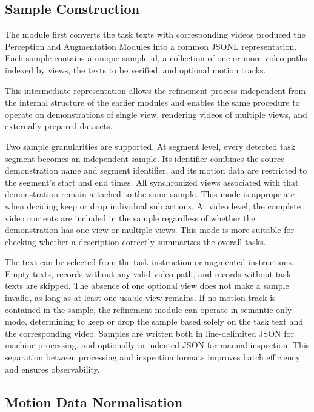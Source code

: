 \documentclass[11pt,oneside]{report}
\begin{document}
\subsection{Sample Construction}

The module first converts the task texts with corresponding videos produced the Perception and Augmentation Modules into a common JSONL representation. Each sample contains a unique sample id, a collection of one or more video paths indexed by views, the texts to be verified, and optional motion tracks.

This intermediate representation allows the refinement process independent from the internal structure of the earlier modules and enables the same procedure to operate on demonstrations of single view, rendering videos of multiple views, and externally prepared datasets.

Two sample granularities are supported. At segment level, every detected task segment becomes an independent sample. Its identifier combines the source demonstration name and segment identifier, and its motion data are restricted to the segment's start and end times. All synchronized views associated with that demonstration remain attached to the same sample. This mode is appropriate when deciding keep or drop individual sub actions. At video level, the complete video contents are included in the sample regardless of whether the demonstration has one view or multiple views. This mode is more suitable for checking whether a description correctly summarizes the overall tasks.

The text can be selected from the task instruction or augmented instructions. Empty texts, records without any valid video path, and records without task texts are skipped. The absence of one optional view does not make a sample invalid, as long as at least one usable view remains. If no motion track is contained in the sample, the refinement module can operate in semantic-only mode, determining to keep or drop the sample based solely on the task text and the corresponding video. Samples are written both in line-delimited JSON for machine processing, and optionally in indented JSON for manual inspection. This separation between processing and inspection formats improves batch efficiency and ensures observability.

\subsection{Motion Data Normalisation}
\end{document}
